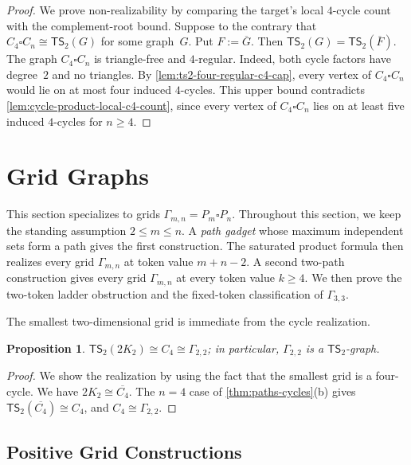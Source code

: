 \documentclass[a4paper]{article}
\theoremstyle{plain}
\newtheorem{proposition}[proposition]{Proposition}
\theoremstyle{definition}
\newcommand{\TSsym}{\mathsf{TS}}
\numberwithin{equation}{section}
\begin{document}
\begin{proof}
We prove non-realizability by comparing the target's local $4$-cycle count with the complement-root bound.
Suppose to the contrary that $C_4\square C_n\cong\TSsym_2(G)$ for some graph~$G$.
Put $F:=\overline{G}$.
Then $\TSsym_2(G)=\TSsym_2(\overline{F})$.
The graph $C_4\square C_n$ is triangle-free and $4$-regular.
Indeed, both cycle factors have degree~$2$ and no triangles.
By \cref{lem:ts2-four-regular-c4-cap}, every vertex of $C_4\square C_n$ would lie on at most four induced $4$-cycles.
This upper bound contradicts \cref{lem:cycle-product-local-c4-count}, since every vertex of $C_4\square C_n$ lies on at least five induced $4$-cycles for $n\ge 4$.
\end{proof}

\section{Grid Graphs}
\label{sec:grid-realizability}

This section specializes to grids $\Gamma_{m,n}=P_m\square P_n$.
Throughout this section, we keep the standing assumption $2\le m\le n$.
A \emph{path gadget} whose maximum independent sets form a path gives the first construction.
The saturated product formula then realizes every grid $\Gamma_{m,n}$ at token value $m+n-2$.
A second two-path construction gives every grid $\Gamma_{m,n}$ at every token value $k\ge 4$.
We then prove the two-token ladder obstruction and the fixed-token classification of $\Gamma_{3,3}$.

The smallest two-dimensional grid is immediate from the cycle realization.

\begin{proposition}
\label{prop:gamma22}
$\TSsym_2(2K_2)\cong C_4\cong\Gamma_{2,2}$; in particular, $\Gamma_{2,2}$ is a $\TSsym_2$-graph.
\end{proposition}

\begin{proof}
We show the realization by using the fact that the smallest grid is a four-cycle.
We have $2K_2\cong\overline{C_4}$.
The $n=4$ case of \cref{thm:paths-cycles}\textup{(b)} gives $\TSsym_2(\overline{C_4})\cong C_4$, and $C_4\cong\Gamma_{2,2}$.
\end{proof}

\subsection{Positive Grid Constructions}
\end{document}
